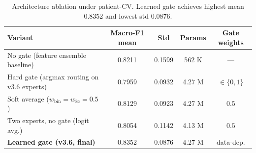 \begin{table}[t]
\centering
\small
\caption{Architecture ablation under patient-CV. Learned gate achieves highest mean 0.8352 and lowest std 0.0876.}
\label{tab:architecture_ablation_full}
\begin{tabular}{lcccc}
\toprule
\textbf{Variant} & \textbf{Macro-F1 mean} & \textbf{Std} & \textbf{Params} & \textbf{Gate weights} \\
\midrule
No gate (feature ensemble baseline) & 0.8211 & 0.1599 & 562 K & — \\
Hard gate (argmax routing on v3.6 experts) & 0.7959 & 0.0932 & 4.27 M & $\in\{0,1\}$ \\
Soft average ($w_\mathrm{bin}{=}w_\mathrm{8c}{=}0.5$) & 0.8129 & 0.0923 & 4.27 M & $0.5$ \\
Two experts, no gate (logit avg.) & 0.8054 & 0.1142 & 4.13 M & $0.5$ \\
\textbf{Learned gate (v3.6, final)} & 0.8352 & 0.0876 & 4.27 M & data-dep. \\
\bottomrule
\end{tabular}
\end{table}
